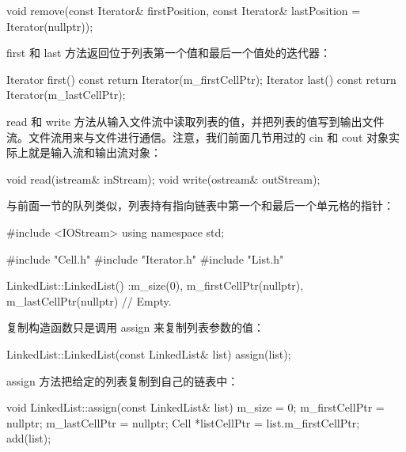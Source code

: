 \begin{codebox}
    void remove(const Iterator& firstPosition,
                const Iterator& lastPosition = Iterator(nullptr));
\end{codebox}

first 和 last 方法返回位于列表第一个值和最后一个值处的迭代器：

\begin{codebox}
    Iterator first() const { return Iterator(m_firstCellPtr); }
    Iterator last() const { return Iterator(m_lastCellPtr); }
\end{codebox}

read 和 write 方法从输入文件流中读取列表的值，并把列表的值写到输出文件流。文件流用来与文件进行通信。注意，我们前面几节用过的 cin 和 cout 对象实际上就是输入流和输出流对象：

\begin{codebox}
    void read(istream& inStream);
    void write(ostream& outStream);
\end{codebox}

与前面一节的队列类似，列表持有指向链表中第一个和最后一个单元格的指针：

\begin{codebox}
  private:
    int m_size;
    Cell *m_firstCellPtr, *m_lastCellPtr;
};
\end{codebox}

\medskip{}

\begin{codebox}
#include <IOStream>
using namespace std;

#include "Cell.h"
#include "Iterator.h"
#include "List.h"

LinkedList::LinkedList()
 :m_size(0),
  m_firstCellPtr(nullptr),
  m_lastCellPtr(nullptr) {
  // Empty.
}
\end{codebox}

复制构造函数只是调用 assign 来复制列表参数的值：

\begin{codebox}
LinkedList::LinkedList(const LinkedList& list) {
  assign(list);
}
\end{codebox}

assign 方法把给定的列表复制到自己的链表中：

\begin{codebox}
void LinkedList::assign(const LinkedList& list) {
  m_size = 0;
  m_firstCellPtr = nullptr;
  m_lastCellPtr = nullptr;
  Cell *listCellPtr = list.m_firstCellPtr;
  add(list);
}
\end{codebox}

